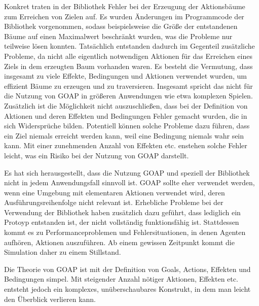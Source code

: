 Konkret traten in der Bibliothek Fehler bei der Erzeugung der Aktionsbäume zum Erreichen von Zielen auf. Es wurden Änderungen im Programmcode der Bibliothek vorgenommen, sodass beispielsweise die Größe der entstandenen Bäume auf einen Maximalwert beschränkt wurden, was die Probleme nur teilweise lösen konnten. Tatsächlich entstanden dadurch im Gegenteil zusätzliche Probleme, da nicht alle eigentlich notwendigen Aktionen für das Erreichen eines Ziels in dem erzeugten Baum vorhanden waren. Es besteht die Vermutung, dass insgesamt zu viele Effekte, Bedingungen und Aktionen verwendet wurden, um effizient Bäume zu erzeugen und zu traversieren. Insgesamt spricht das nicht für die Nutzung von GOAP in größeren Anwendungen wie etwa komplexen Spielen.
Zusätzlich ist die Möglichkeit nicht auszuschließen, dass bei der Definition von Aktionen und deren Effekten und Bedingungen Fehler gemacht wurden, die in sich Widersprüche bilden. Potentiell können solche Probleme dazu führen, dass ein Ziel niemals erreicht werden kann, weil eine Bedingung niemals wahr sein kann. Mit einer zunehmenden Anzahl von Effekten etc. enstehen solche Fehler leicht, was ein Risiko bei der Nutzung von GOAP darstellt.

Es hat sich herausgestellt, dass die Nutzung GOAP und speziell der Bibliothek nicht in jedem Anwendungsfall sinnvoll ist. GOAP sollte eher verwendet werden, wenn eine Umgebung mit elementaren Aktionen verwendet wird, deren Ausführungsreihenfolge nicht relevant ist. Erhebliche Probleme bei der Verwendung der Bibliothek haben zusätzlich dazu geführt, dass lediglich ein Protoyp entstanden ist, der nicht vollständig funktionsfähig ist. Stattdessen kommt es zu Performanceproblemen und Fehlersituationen, in denen Agenten aufhören, Aktionen auszuführen. Ab einem gewissen Zeitpunkt kommt die Simulation daher zu einem Stillstand.

Die Theorie von GOAP ist mit der Definition von Goals, Actions, Effekten und Bedingungen simpel. Mit steigender Anzahl nötiger Aktionen, Effekten etc. entsteht jedoch ein komplexes, unüberschaubares Konstrukt, in dem man leicht den Überblick verlieren kann. 




